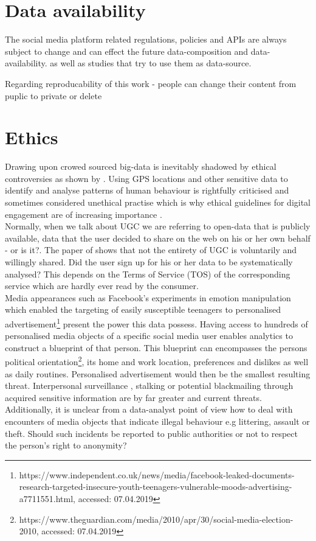 \section{Data availability}
The social media platform related regulations, policies and APIs are always subject to change and can effect the future data-composition and data-availability. as well as studies that try to use them as data-source.

Regarding reproducability of this work
- people can change their content from puplic to private or delete




\section{Ethics}
Drawing upon crowed sourced big-data is inevitably shadowed by ethical controversies as shown by \textcite{Taylor2018}. Using GPS locations and other sensitive data to identify and analyse patterns of human behaviour is rightfully criticised and sometimes considered unethical practise \parencite{Taylor2018} which is why ethical guidelines for digital engagement are of increasing importance \parencite{Bowen2013}.\\
Normally, when we talk about UGC we are referring to open-data that is publicly available, data that the user decided to share on the web on his or her own behalf - or is it?. The paper of \textcite{Estima2016} shows that not the entirety of UGC is voluntarily and willingly shared. Did the user sign up for his or her data to be systematically analysed? This depends on the Terms of Service (TOS) of the corresponding service which are hardly ever read by the consumer.\\
Media appearances such as Facebook's experiments in emotion manipulation \parencite{Jouhki2016} which enabled the targeting of easily susceptible teenagers to personalised advertisement\footnote{https://www.independent.co.uk/news/media/facebook-leaked-documents-research-targeted-insecure-youth-teenagers-vulnerable-moods-advertising-a7711551.html, accessed: 07.04.2019} present the power this data possess. Having access to hundreds of personalised media objects of a specific social media user enables analytics to construct a blueprint of that person. This blueprint can encompasses the persons political orientation\footnote{https://www.theguardian.com/media/2010/apr/30/social-media-election-2010, accessed: 07.04.2019}, its home and work location, preferences and dislikes as well as daily routines. Personalised advertisement would then be the smallest resulting threat. Interpersonal surveillance \parencite{Trottier2017}, stalking \parencite{Lyndon2011} or potential blackmailing through acquired sensitive information are by far greater and current threats. Additionally, it is unclear from a data-analyst point of view how to deal with encounters of media objects that indicate illegal behaviour e.g littering, assault or theft. Should such incidents be reported to public authorities or not to respect the person's right to anonymity?\\

